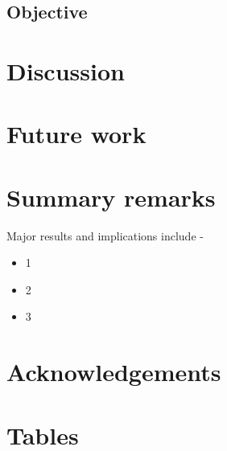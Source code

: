 \documentclass[11pt,a4paper]{article}
\makeatletter
\renewcommand\listoftables{%
    \@starttoc{lot}%
}
\renewcommand{\headrulewidth}{0pt} %
\makeatother
\begin{document}
\subsection{Objective} \label{sec-obj}


\newpage


\section{Discussion} \label{sec-disc}


\newpage


\section{Future work} \label{sec-fwk}


\newpage


\section{Summary remarks} \label{sec-sum}

Major results and implications include - 
\begin{itemize}[topsep=0pt,itemsep=-0.75ex,partopsep=1ex,parsep=1ex,leftmargin=*]
    \item 1
    \item 2
    \item 3
\end{itemize}


\newpage


\pagestyle{fancyplain}
\fancyhf{} %
\renewcommand{\headrulewidth}{0pt} %
\rfoot{\fancyplain{}{\thepage}}
\nolinenumbers


\section*{Acknowledgements}


\newpage


%
%

\setlength{\bibhang}{0pt}

%


\newpage


\section*{Tables}
{%
\let\oldnumberline\numberline%
\renewcommand{\numberline}{\tablename~\oldnumberline}%
\listoftables%
}
\end{document}
